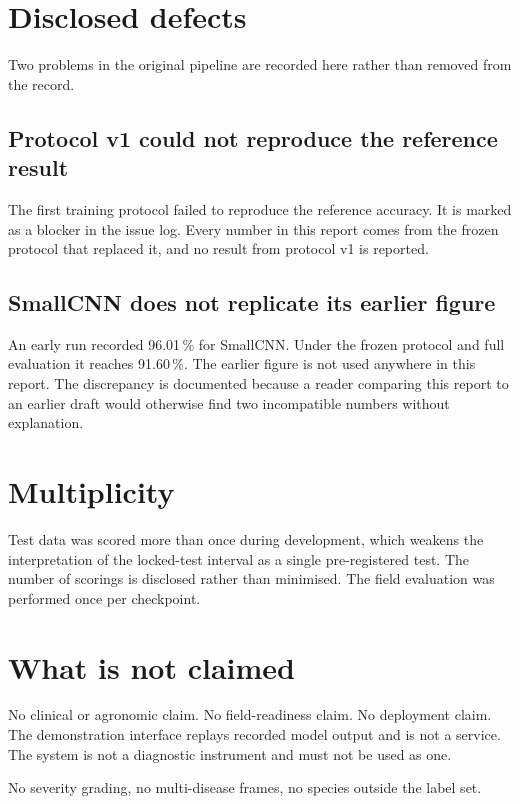 \section{Disclosed defects}

Two problems in the original pipeline are recorded here rather than removed from the
record.

\subsection{Protocol v1 could not reproduce the reference result}

The first training protocol failed to reproduce the reference accuracy. It is marked
as a blocker in the issue log. Every number in this report comes from the frozen
protocol that replaced it, and no result from protocol v1 is reported.

\subsection{SmallCNN does not replicate its earlier figure}

An early run recorded 96.01\,\% for SmallCNN. Under the frozen protocol and full
evaluation it reaches 91.60\,\%. The earlier figure is not used anywhere in this
report. The discrepancy is documented because a reader comparing this report to an
earlier draft would otherwise find two incompatible numbers without explanation.

\section{Multiplicity}

Test data was scored more than once during development, which weakens the
interpretation of the locked-test interval as a single pre-registered test. The
number of scorings is disclosed rather than minimised. The field evaluation was
performed once per checkpoint.

\section{What is not claimed}

No clinical or agronomic claim. No field-readiness claim. No deployment claim. The
demonstration interface replays recorded model output and is not a service. The
system is not a diagnostic instrument and must not be used as one.

No severity grading, no multi-disease frames, no species outside the label set.
